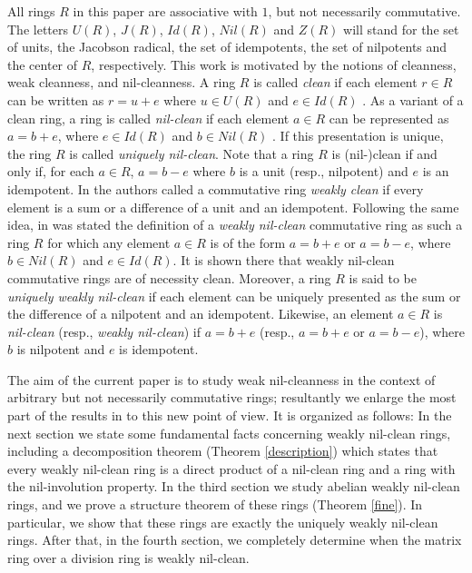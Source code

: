 \documentclass[12]{amsart}
\theoremstyle{definition}
\numberwithin{equation}{section}
\begin{document}
All rings $R$ in this paper are associative with $1$, but not necessarily commutative. The letters $U(R)$, $J(R)$, $Id(R)$, $Nil(R)$ and $Z(R)$ will stand for the set of units, the Jacobson radical, the set of idempotents, the set of nilpotents and the center of $R$, respectively. This work is motivated by the notions of cleanness, weak cleanness, and nil-cleanness. A ring $R$
is called {\it clean} if each element $r\in R$ can be written as $r=u+e$ where $u\in U(R)$ and $e\in Id(R)$ \cite{N77}.
As a variant of a clean ring, a ring is called {\sl nil-clean} if each element $a\in R$ can be represented as $a=b+e$, where $e\in Id(R)$ and $b\in Nil(R)$  \cite{D13}. If this presentation is unique, the ring $R$ is called {\it uniquely nil-clean}. 
Note that a ring $R$ is (nil-)clean if and only if,  for each $a\in R$, $a=b-e$ where $b$ is a unit (resp., nilpotent) and $e$ is an idempotent. In \cite{AA06} the authors called a commutative ring {\sl weakly clean} if every element is a sum or a difference of a unit and an idempotent.
Following the same idea, in \cite{DM14} was stated the definition of a {\it weakly nil-clean} commutative ring as such a ring $R$ for which any element $a\in R$ is of the form $a=b+e$ or $a=b-e$, where $b\in Nil(R)$ and $e\in Id(R)$. It is shown there that weakly nil-clean commutative rings are of necessity clean. Moreover, a ring $R$ is said to be {\it uniquely weakly nil-clean} if each element can be uniquely presented as the sum or the difference of a nilpotent and an idempotent. Likewise, an element $a\in R$ is \textit{nil-clean} (resp., {\it weakly nil-clean}) if $a=b+e$ (resp., $a=b+e$ or $a=b-e$), where $b$ is nilpotent and $e$ is idempotent.

The aim of the current paper is to study weak nil-cleanness in the context of arbitrary but not necessarily commutative rings; resultantly we enlarge the most part of the results in \cite{D13} to this new point of view. It is organized as follows: In the next section we state some fundamental facts concerning weakly nil-clean rings, including a decomposition
theorem (Theorem \ref{description}) which states that every weakly nil-clean ring is a direct product of a nil-clean ring and a ring with the nil-involution property. In the third section we study abelian weakly nil-clean rings, and we prove a structure theorem of these rings (Theorem \ref{fine}). In particular, we show that these rings are exactly the uniquely weakly nil-clean rings. After that, in the fourth section, we completely determine when the matrix ring over a division ring is weakly nil-clean.
\end{document}
